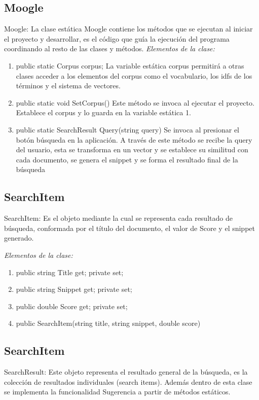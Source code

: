 \documentclass[a4paper,12pt,twocolumn]{article}
\begin{document}
\subsection{Moogle}
Moogle: La clase estática Moogle contiene los métodos que se ejecutan al iniciar el
proyecto y desarrollar, es el código que guía la ejecución del programa coordinando al
resto de las clases y métodos.
\emph{Elementos de la clase:}
\begin{enumerate}

\item public static Corpus corpus;
    La variable estática corpus permitirá a otras clases acceder a los elementos del
    corpus como el vocabulario, los idfs de los términos y el sistema de vectores.
\item public static void SetCorpus()
    Este método se invoca al ejecutar el proyecto. Establece el corpus y lo guarda en
    la variable estática 1.
\item public static SearchResult Query(string query)
    Se invoca al presionar el botón búsqueda en la aplicación. A través de este método
    se recibe la query del usuario, esta se transforma en un vector y se establece su
    similitud con cada documento, se genera el snippet y se forma el resultado final de
    la búsqueda
\end{enumerate}

\subsection{SearchItem}
SearchItem: Es el objeto mediante la cual se representa cada resultado de búsqueda,
conformada por el título del documento, el valor de Score y el snippet generado.

\emph{Elementos de la clase:}
\begin{enumerate}
    \item public string Title { get; private set; }
    \item public string Snippet { get; private set; }
    \item public double Score { get; private set; }
    \item public SearchItem(string title, string snippet, double score)
\end{enumerate}


\subsection{SearchItem}
SearchResult: Este objeto representa el resultado general de la búsqueda, es la
colección de resultados individuales (search items). Además dentro de esta clase se
implementa la funcionalidad Sugerencia a partir de métodos estáticos.
\end{document}
